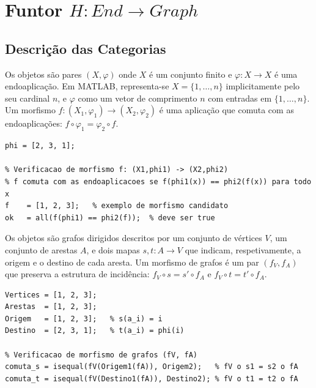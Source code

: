 \section{Funtor \texorpdfstring{$H: End \to Graph$}{H: End -> Graph}}
\label{sec:functor-end-graph}

\subsection{Descrição das Categorias}

\begin{definition}
Os objetos são pares $(X, \varphi)$ onde $X$ é um conjunto finito e $\varphi: X \to X$ é uma endoaplicação. Em MATLAB, representa-se $X = \{1, \ldots, n\}$ implicitamente pelo seu cardinal $n$, e $\varphi$ como um vetor de comprimento $n$ com entradas em $\{1, \ldots, n\}$. Um morfismo $f: (X_1, \varphi_1) \to (X_2, \varphi_2)$ é uma aplicação que comuta com as endoaplicações: $f \circ \varphi_1 = \varphi_2 \circ f$.
\end{definition}

\begin{lstlisting}[style=matlab, caption={Objeto e morfismo em $\mathbf{End}$}]
% Objeto: conjunto {1,2,3} com endoaplicacao phi(1)=2, phi(2)=3, phi(3)=1
phi = [2, 3, 1];

% Verificacao de morfismo f: (X1,phi1) -> (X2,phi2)
% f comuta com as endoaplicacoes se f(phi1(x)) == phi2(f(x)) para todo x
f    = [1, 2, 3];   % exemplo de morfismo candidato
ok   = all(f(phi1) == phi2(f));  % deve ser true
\end{lstlisting}

\begin{definition}
Os objetos são grafos dirigidos descritos por um conjunto de vértices $V$, um conjunto de arestas $A$, e dois mapas $s, t: A \to V$ que indicam, respetivamente, a origem e o destino de cada aresta. Um morfismo de grafos é um par $(f_V, f_A)$ que preserva a estrutura de incidência: $f_V \circ s = s' \circ f_A$ e $f_V \circ t = t' \circ f_A$.
\end{definition}

\begin{lstlisting}[style=matlab, caption={Objeto e morfismo em $\mathbf{Graph}$}]
% Grafo dirigido com 3 vertices e 3 arestas
Vertices = [1, 2, 3];
Arestas  = [1, 2, 3];
Origem   = [1, 2, 3];   % s(a_i) = i
Destino  = [2, 3, 1];   % t(a_i) = phi(i)

% Verificacao de morfismo de grafos (fV, fA)
comuta_s = isequal(fV(Origem1(fA)), Origem2);   % fV o s1 = s2 o fA
comuta_t = isequal(fV(Destino1(fA)), Destino2); % fV o t1 = t2 o fA
\end{lstlisting}

